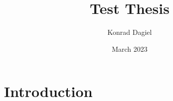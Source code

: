 \documentclass{report}
\title{Test Thesis}
\author{Konrad Dagiel}
\date{March 2023}
\begin{document}
\maketitle

\section{Introduction}
\end{document}
